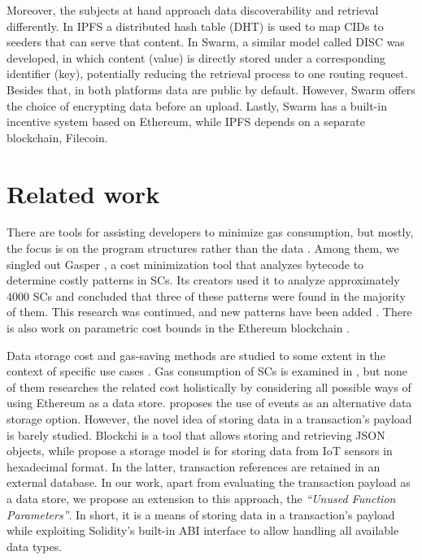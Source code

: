 Moreover, the subjects at hand approach data discoverability and retrieval differently. In IPFS a distributed hash table (DHT) \citep{benet_2014} is used to map CIDs to seeders that can serve that content. In Swarm, a similar model called DISC  \citep{tron_2020} was developed, in which content (value) is directly stored under a corresponding identifier (key), potentially reducing the retrieval process to one routing request. Besides that, in both platforms data are public by default. However, Swarm offers the choice of encrypting data before an upload. Lastly, Swarm has a built-in incentive system based on Ethereum, while IPFS depends on a separate blockchain, Filecoin. 

\section{Related work}\label{sec:related_work}
There are tools for assisting developers to minimize gas consumption, but mostly, the focus is on the program structures rather than the data  \citep{nelaturu_2021, chen_2017, chen_2021}. Among them, we singled out Gasper  \citep{chen_2017}, a cost minimization tool that analyzes bytecode to determine costly patterns in SCs. Its creators used it to analyze approximately 4000 SCs and concluded that three of these patterns were found in the majority of them. This research was continued, and new patterns have been added  \citep{chen_2021}. There is also work on parametric cost bounds in the Ethereum blockchain \citep{albert_2021}.

Data storage cost and gas-saving methods are studied to some extent in the context of specific use cases  \citep{kurt_2020, delgado_2019, westerkamp_2020}. Gas consumption of SCs is examined in  \citep{grech_2020, signer_2018}, but none of them researches the related cost holistically by considering all possible ways of using Ethereum as a data store. \cite{consensys} proposes the use of events as an alternative data storage option. However, the novel idea of storing data in a transaction’s payload is barely studied. Blockchi \citep{yankov_2018} is a tool that allows storing and retrieving JSON objects, while \cite{xie_2017} propose a storage model is for storing data from IoT sensors in hexadecimal format. In the latter, transaction references are retained in an external database. In our work, apart from evaluating the transaction payload as a data store, we propose an extension to this approach, the \emph{``Unused Function Parameters''}. In short, it is a means of storing data in a transaction's payload while exploiting Solidity's built-in ABI interface to allow handling all available data types.

